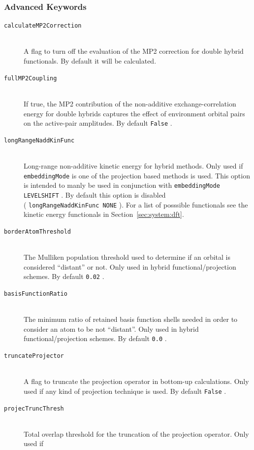 \documentclass[bibliography=totocnumbered,a4paper,10pt,oneside]{scrbook}
\newcommand{\ttt}[1]{%
  \begingroup\setlength{\fboxsep}{1pt}%
  \colorbox{serenity-green!30}{\texttt{\hspace*{2pt}\vphantom{(g}#1\hspace*{2pt}}}%
  \endgroup
}
\begin{document}
\subsubsection{Advanced Keywords}
\begin{description}
  \item [\texttt{calculateMP2Correction}]\hfill \\
    A flag to turn off the evaluation of the MP2 correction for double hybrid functionals. By default it will
    be calculated.
  \item [\texttt{fullMP2Coupling}]\hfill \\
    If true, the MP2 contribution of the non-additive exchange-correlation energy for double hybrids captures
    the effect of environment orbital pairs on the active-pair amplitudes. By default \ttt{False}.
  \item [\texttt{longRangeNaddKinFunc}]\hfill \\
    Long-range non-additive kinetic energy for hybrid methods. Only used if \ttt{embeddingMode} is one of
    the projection based methods is used. This option is intended to manly be used in conjunction with
    \ttt{embeddingMode LEVELSHIFT}. By default this option is disabled\\ (\ttt{longRangeNaddKinFunc NONE}).
    For a list of posssible functionals see the kinetic energy functionals in Section~\ref{sec:system:dft}.
  \item [\texttt{borderAtomThreshold}]\hfill \\
    The Mulliken population threshold used to determine if an orbital is considered ``distant'' or not.
    Only used in hybrid functional/projection schemes. By default \ttt{0.02}.
  \item [\texttt{basisFunctionRatio}]\hfill \\
    The minimum ratio of retained basis function shells needed in order to consider an atom to be not
    ``distant''. Only used in hybrid functional/projection schemes. By default \ttt{0.0}.
  \item [\texttt{truncateProjector}]\hfill \\
    A flag to truncate the projection operator in bottom-up calculations. Only used if any kind of projection
    technique is used. By default \ttt{False}.
  \item [\texttt{projecTruncThresh}]\hfill \\
    Total overlap threshold for the truncation of the projection operator. Only used if \\

\end{description}
\end{document}
